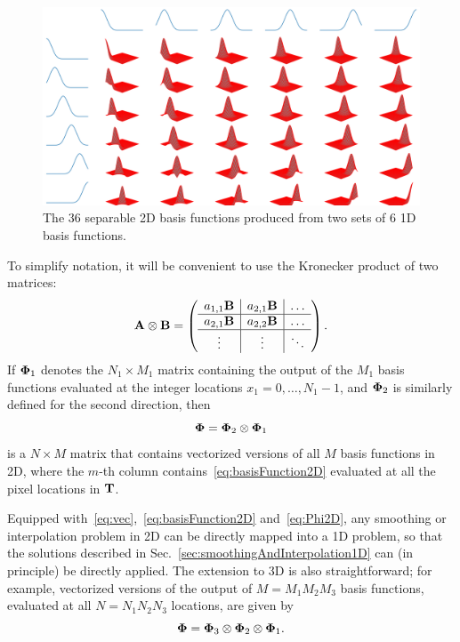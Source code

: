 \documentclass[10pt,twoside]{book}
\begin{document}
\begin{figure}
  \centering
  \includegraphics[width=\textwidth]{smoothing2D_decimationFactor51_basisFunctions}
  \caption{The 36 separable 2D basis functions produced from two sets of 6 1D basis functions.}
  \label{fig:basisFunctions2D_BSpline}
\end{figure}


%
To simplify notation, it will be convenient to use the Kronecker product of two matrices:
$$
\mathbf{A} \otimes \mathbf{B} =
\left(
\begin{array}{c|c|c}
a_{1,1} \mathbf{B} & a_{2,1} \mathbf{B} & \hdots \\
\hline
a_{2,1} \mathbf{B} & a_{2,2} \mathbf{B} & \hdots \\
\hline
\vdots          & \vdots          & \ddots
\end{array}
\right)
.
$$
%
If ${\mbox{\boldmath {${\Phi}$}}}_1$ denotes the $N_1 \times M_1$ matrix containing the output of the $M_1$ basis functions evaluated at the integer locations $x_1=0,\ldots,N_1-1$, and ${\mbox{\boldmath {${\Phi}$}}}_2$ is similarly defined for the second direction, then 
\begin{equation}
{\mbox{\boldmath {${\Phi}$}}} = {\mbox{\boldmath {${\Phi}$}}}_2 \otimes {\mbox{\boldmath {${\Phi}$}}}_1
\label{eq:Phi2D}
\end{equation}
is a $N \times M$ matrix that contains vectorized versions of all $M$ basis functions in 2D, where the $m$-th column contains~\eqref{eq:basisFunction2D} evaluated at all the pixel locations in $\mathbf{T}$.

%
Equipped with~\eqref{eq:vec},~\eqref{eq:basisFunction2D} and~\eqref{eq:Phi2D}, any smoothing or interpolation problem in 2D can be directly mapped into a 1D problem,
so that the solutions described in Sec.~\ref{sec:smoothingAndInterpolation1D} can (in principle) be directly applied. 
%
The extension to 3D is also straightforward; for example, vectorized versions of the output of $M = M_1 M_2 M_3$ basis functions, evaluated at all $N = N_1 N_2 N_3$ locations, are given by
$$
{\mbox{\boldmath {${\Phi}$}}} = {\mbox{\boldmath {${\Phi}$}}}_3 \otimes {\mbox{\boldmath {${\Phi}$}}}_2 \otimes {\mbox{\boldmath {${\Phi}$}}}_1 
.
$$
\end{document}
